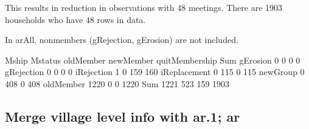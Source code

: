 This results in reduction in observations with 48 meetings. There are 1903 households who have 48 rows in data.



In \textsf{arAll}, nonmembers (\textsf{gRejection, gErosion}) are not included.
\begin{Schunk}
\begin{Soutput}
              Mship
Mstatus        oldMember newMember quitMembership  Sum
  gErosion             0         0              0    0
  gRejection           0         0              0    0
  iRejection           1         0            159  160
  iReplacement         0       115              0  115
  newGroup             0       408              0  408
  oldMember         1220         0              0 1220
  Sum               1221       523            159 1903
\end{Soutput}
\end{Schunk}






\subsection{Merge village level info with \textsf{ar.1}; \textsf{ar}}

